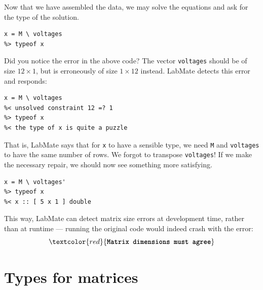 \documentclass{IMEKO2024}
\begin{document}
Now that we have assembled the data, we may solve the equations and ask for the type of the solution.
\begin{verbatim}
x = M \ voltages
%> typeof x
\end{verbatim}
Did you notice the error in the above code? The vector \texttt{voltages} should be of size $12 \times 1$, but is erroneously of size $1 \times 12$ instead. LabMate detects this error and responds:

\begin{verbatim}
x = M \ voltages
%< unsolved constraint 12 =? 1
%> typeof x
%< the type of x is quite a puzzle
\end{verbatim}
%
That is, LabMate says that for \texttt{x} to have a sensible type, we need \texttt{M} and \texttt{voltages} to have the same number of rows. We forgot to transpose \texttt{voltages}! If we make the necessary repair, we should now see something more satisfying.
\begin{verbatim}
x = M \ voltages'
%> typeof x
%< x :: [ 5 x 1 ] double
\end{verbatim}
This way, LabMate can detect matrix size errors at development time, rather than at runtime --- running the original code would indeed crash with the error:
\[\textcolor{red}{\textbf{\texttt{Matrix dimensions must agree}}}\]

\section{Types for matrices}

\newcommand{\rs}{\mathit{rs}}
\newcommand{\ms}{\mathit{ms}}
\newcommand{\cs}{\mathit{cs}}
\end{document}
